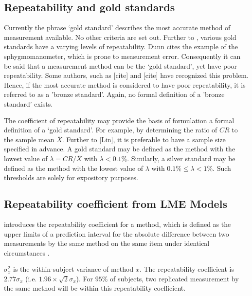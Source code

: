 \documentclass[12pt, a4paper]{article}
\begin{document}
\subsection{Repeatability and gold standards}
Currently the phrase `gold standard' describes the most accurate method of measurement available. No other criteria are set out. Further to \citet{dunnSEME}, various gold standards have a varying levels of repeatability. Dunn cites the example of the sphygmomanometer, which is prone to measurement error. Consequently it can be said that a measurement method can be the `gold standard', yet have poor repeatability. Some authors, such as [cite] and [cite] have recognized this problem. Hence, if the most accurate method is considered to have poor repeatability, it is referred to as a 'bronze standard'.  Again, no formal definition of a 'bronze standard' exists.

The coefficient of repeatability may provide the basis of formulation a formal definition of a `gold standard'. For example, by determining the ratio of $CR$ to the sample mean $\bar{X}$. Further to [Lin], it is preferable to have a sample size specified in advance. A gold standard may be defined as the method with the lowest value of $\lambda = CR /\bar{X}$ with $\lambda < 0.1\%$. Similarly, a silver standard may be defined as the method with the lowest value of $\lambda $ with $0.1\% \leq \lambda < 1\%$. Such thresholds are solely for expository purposes.




\subsection{Repeatability coefficient from LME Models}
\citet{BA99} introduces the repeatability coefficient for a method, which is defined as the upper limits of a prediction interval for the absolute difference between two measurements by the same
method on the same item under identical circumstances \citep{BXC2008}.

$\sigma^2_{x}$ is the within-subject variance of method $x$. The repeatability coefficient is $2.77 \sigma_{x}$ (i.e. $1.96 \times \sqrt{2} \sigma_{x}$). For $95\%$ of subjects, two replicated measurement by the same method will be within this repeatability coefficient.

\end{document}

